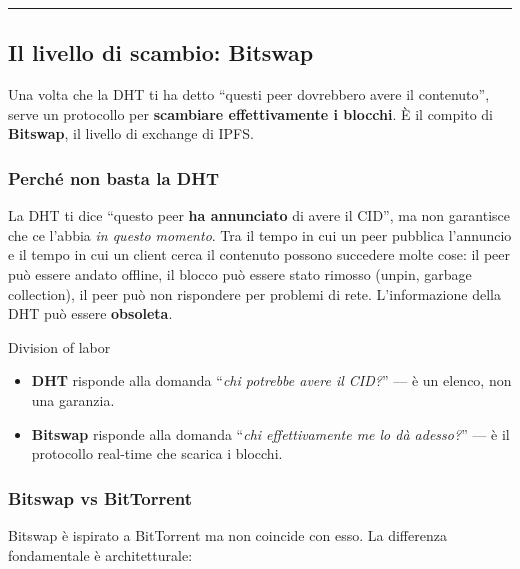 \documentclass[
  italian,
  openany]{book}
\providecommand{\tightlist}{%
  \setlength{\itemsep}{0pt}\setlength{\parskip}{0pt}}
\begin{document}
\begin{center}\rule{0.5\linewidth}{0.5pt}\end{center}

\subsection{Il livello di scambio:
Bitswap}\label{il-livello-di-scambio-bitswap}

Una volta che la DHT ti ha detto ``questi peer dovrebbero avere il
contenuto'', serve un protocollo per \textbf{scambiare effettivamente i
blocchi}. È il compito di \textbf{Bitswap}, il livello di exchange di
IPFS.

\subsubsection{Perché non basta la
DHT}\label{perchuxe9-non-basta-la-dht}

La DHT ti dice ``questo peer \textbf{ha annunciato} di avere il CID'',
ma non garantisce che ce l'abbia \emph{in questo momento}. Tra il tempo
in cui un peer pubblica l'annuncio e il tempo in cui un client cerca il
contenuto possono succedere molte cose: il peer può essere andato
offline, il blocco può essere stato rimosso (unpin, garbage collection),
il peer può non rispondere per problemi di rete. L'informazione della
DHT può essere \textbf{obsoleta}.

\begin{calloutnote}{Division of labor}

\begin{itemize}
\tightlist
\item
  \textbf{DHT} risponde alla domanda ``\emph{chi potrebbe avere il
  CID?}'' --- è un elenco, non una garanzia.
\item
  \textbf{Bitswap} risponde alla domanda ``\emph{chi effettivamente me
  lo dà adesso?}'' --- è il protocollo real-time che scarica i blocchi.
\end{itemize}

\end{calloutnote}

\subsubsection{Bitswap vs BitTorrent}\label{bitswap-vs-bittorrent}

Bitswap è ispirato a BitTorrent ma non coincide con esso. La differenza
fondamentale è architetturale:
\end{document}

